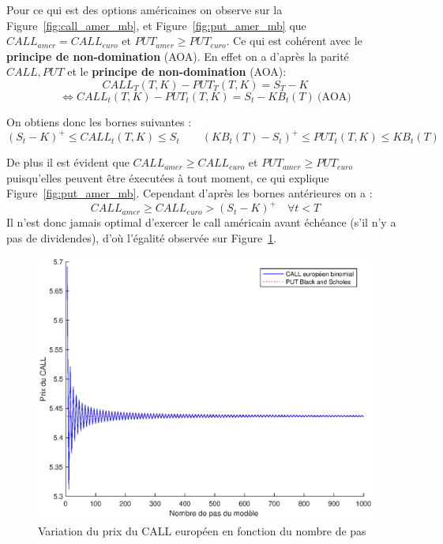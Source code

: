 Pour ce qui est des options américaines on observe sur la Figure~\ref{fig:call_amer_mb}, et Figure~\ref{fig:put_amer_mb} que $CALL_{amer}=CALL_{euro}$ et $PUT_{amer}\geq PUT_{euro}$. Ce qui est cohérent avec le \textbf{principe de non-domination} (AOA). En effet on a d'après la parité $CALL, PUT$ et le \textbf{principe de non-domination} (AOA): 
\[
	 CALL_T(T,K)-PUT_T(T,K)=S_T-K 
\]
\[
	\Leftrightarrow CALL_t(T,K)-PUT_t(T,K)=S_t-KB_t(T)  \ \text{(AOA)}
\]

On obtiens donc les bornes suivantes : 
\[
	(S_t-K)^+ \leq CALL_t(T,K) \leq S_t \qquad (KB_t(T)-S_t)^+ \leq PUT_t(T,K) \leq KB_t(T)
\]

De plus il est évident que $CALL_{amer}\geq CALL_{euro}$ et $PUT_{amer}\geq PUT_{euro}$ puisqu'elles peuvent être éxecutées à tout moment, ce qui explique Figure~\ref{fig:put_amer_mb}. Cependant d'après les bornes antérieures on a : 
\[
	CALL_{amer}\geq CALL_{euro}> (S_t-K)^+ \quad \forall t < T
\]
Il n'est donc jamais optimal d'exercer le call américain avant échéance (s'il n'y a pas de dividendes), d'où l'égalité observée sur Figure~\ref{fig:call_euro_mb}.

\begin{figure}[H]
\centering
\includegraphics[scale=0.6]{./img/CALL_EURO-BS.eps}
\caption{Variation du prix du CALL européen en fonction du nombre de pas}
\label{fig:call_euro_mb}
\end{figure}


